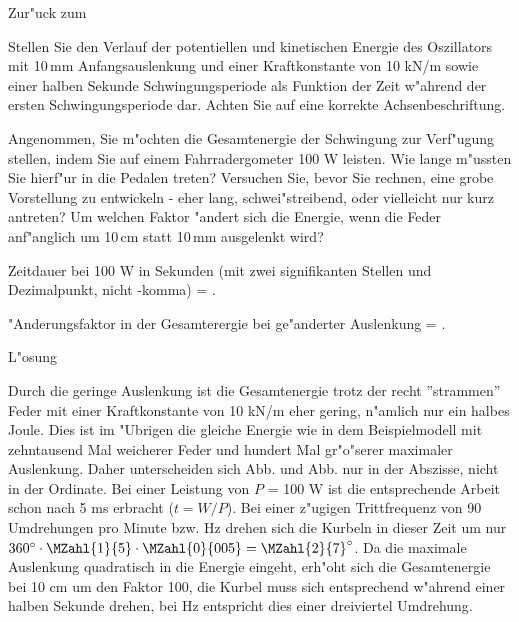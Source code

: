 \begin{MExercises}
\begin{MExercise}
Zur"uck zum 
\end{MExercise}

\begin{MExercise}
Stellen Sie den Verlauf der potentiellen und kinetischen Energie des Oszillators mit 10\,mm Anfangsauslenkung und einer Kraftkonstante von 10 kN/m sowie einer halben Sekunde Schwingungsperiode als Funktion der Zeit w"ahrend der ersten Schwingungsperiode dar. Achten Sie auf eine korrekte Achsenbeschriftung. 

Angenommen, Sie m"ochten die Gesamtenergie der Schwingung zur Verf"ugung stellen, indem Sie auf einem Fahrradergometer 100 W leisten. Wie lange m"ussten Sie hierf"ur in die Pedalen treten? Versuchen Sie, bevor Sie rechnen, eine grobe Vorstellung zu entwickeln - eher lang, schwei"streibend, oder vielleicht nur kurz antreten? Um welchen Faktor "andert sich die Energie, wenn die Feder anf"anglich um 10\,cm statt 10\,mm ausgelenkt wird?

Zeitdauer bei 100 W in Sekunden (mit zwei signifikanten Stellen und Dezimalpunkt, nicht -komma) = .

"Anderungsfaktor in der Gesamterergie bei ge"anderter Auslenkung = .

\begin{MHint}{L"osung} 
\begin{center}
  \end{center}

Durch die geringe Auslenkung ist die Gesamtenergie trotz der recht ''strammen'' Feder mit einer Kraftkonstante von 10 kN/m eher gering, n"amlich nur ein halbes Joule. Dies ist im "Ubrigen die gleiche Energie wie in dem Beispielmodell mit zehntausend Mal weicherer Feder und hundert Mal gr"o"serer maximaler Auslenkung. Daher unterscheiden sich Abb.  und Abb.  nur in der Abszisse, nicht in der Ordinate. Bei einer Leistung von $P$ = 100 W ist die entsprechende Arbeit schon nach 5 ms erbracht ($t=W / P$). Bei einer z"ugigen Trittfrequenz von 90 Umdrehungen pro Minute bzw.  Hz drehen sich die Kurbeln in dieser Zeit um nur $360^\circ \cdot \MZahl{1}{5} \cdot \MZahl{0}{005} = \MZahl{2}{7}^\circ$. Da die maximale Auslenkung quadratisch in die Energie eingeht, erh"oht sich die Gesamtenergie bei 10 cm um den Faktor 100, die Kurbel muss sich entsprechend w"ahrend einer halben Sekunde drehen, bei  Hz entspricht dies einer dreiviertel Umdrehung.
\end{MHint}


\end{MExercise}
\end{MExercises}
